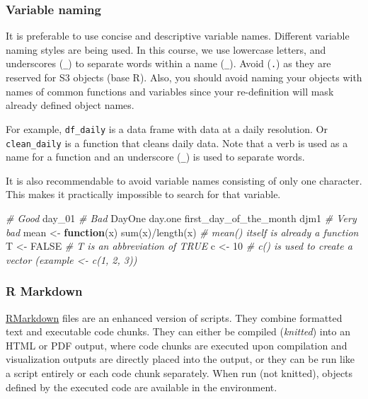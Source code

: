 \documentclass[
]{book}
\newenvironment{Shaded}{\begin{snugshade}}{\end{snugshade}}
\newcommand{\CommentTok}[1]{\textcolor[rgb]{0.56,0.35,0.01}{\textit{#1}}}
\newcommand{\ConstantTok}[1]{\textcolor[rgb]{0.00,0.00,0.00}{#1}}
\newcommand{\ControlFlowTok}[1]{\textcolor[rgb]{0.13,0.29,0.53}{\textbf{#1}}}
\newcommand{\DecValTok}[1]{\textcolor[rgb]{0.00,0.00,0.81}{#1}}
\newcommand{\FunctionTok}[1]{\textcolor[rgb]{0.00,0.00,0.00}{#1}}
\newcommand{\NormalTok}[1]{#1}
\newcommand{\OtherTok}[1]{\textcolor[rgb]{0.56,0.35,0.01}{#1}}
\newcommand{\SpecialCharTok}[1]{\textcolor[rgb]{0.00,0.00,0.00}{#1}}
\begin{document}
\hypertarget{variable-naming}{%
\subsubsection{Variable naming}\label{variable-naming}}

It is preferable to use concise and descriptive variable names. Different variable naming styles are being used. In this course, we use lowercase letters, and underscores (\texttt{\_}) to separate words within a name (\texttt{\_}). Avoid (\texttt{.}) as they are reserved for S3 objects (base R). Also, you should avoid naming your objects with names of common functions and variables since your re-definition will mask already defined object names.

For example, \texttt{df\_daily} is a data frame with data at a daily resolution. Or \texttt{clean\_daily} is a function that cleans daily data. Note that a verb is used as a name for a function and an underscore (\texttt{\_}) is used to separate words.

It is also recommendable to avoid variable names consisting of only one character. This makes it practically impossible to search for that variable.

\begin{Shaded}
\begin{Highlighting}[]
\CommentTok{\# Good}
\NormalTok{day\_01}
\CommentTok{\# Bad}
\NormalTok{DayOne}
\NormalTok{day.one}
\NormalTok{first\_day\_of\_the\_month}
\NormalTok{djm1}
\CommentTok{\# Very bad}
\NormalTok{mean }\OtherTok{\textless{}{-}} \ControlFlowTok{function}\NormalTok{(x) }\FunctionTok{sum}\NormalTok{(x)}\SpecialCharTok{/}\FunctionTok{length}\NormalTok{(x) }\CommentTok{\# mean() itself is already a function}
\NormalTok{T }\OtherTok{\textless{}{-}} \ConstantTok{FALSE} \CommentTok{\# T is an abbreviation of TRUE}
\NormalTok{c }\OtherTok{\textless{}{-}} \DecValTok{10} \CommentTok{\# c() is used to create a vector (example \textless{}{-} c(1, 2, 3))}
\end{Highlighting}
\end{Shaded}

\hypertarget{r-markdown}{%
\subsubsection{R Markdown}\label{r-markdown}}

\href{https://rmarkdown.rstudio.com/}{RMarkdown} files are an enhanced version of scripts. They combine formatted text and executable code chunks. They can either be compiled (\emph{knitted}) into an HTML or PDF output, where code chunks are executed upon compilation and visualization outputs are directly placed into the output, or they can be run like a script entirely or each code chunk separately. When run (not knitted), objects defined by the executed code are available in the environment.
\end{document}
